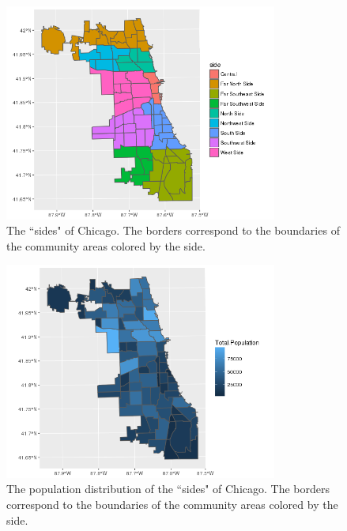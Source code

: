 \documentclass{article} %
\begin{document}
\begin{figure}[h]
\begin{center}

\includegraphics[width=0.8\textwidth,keepaspectratio]{CopyOfside.png}
\caption{The ``sides" of Chicago.  The borders correspond to  the boundaries of the community areas colored by the side.}
\label{sides}
\end{center}
\end{figure}


\begin{figure}[h]
\begin{center}

\includegraphics[width=0.8\textwidth,keepaspectratio]{Plots/population.png}
\caption{The population distribution of the  ``sides" of Chicago.  The borders correspond to  the boundaries of the community areas colored by the side.}
\label{population}
\end{center}
\end{figure}
\end{document}
